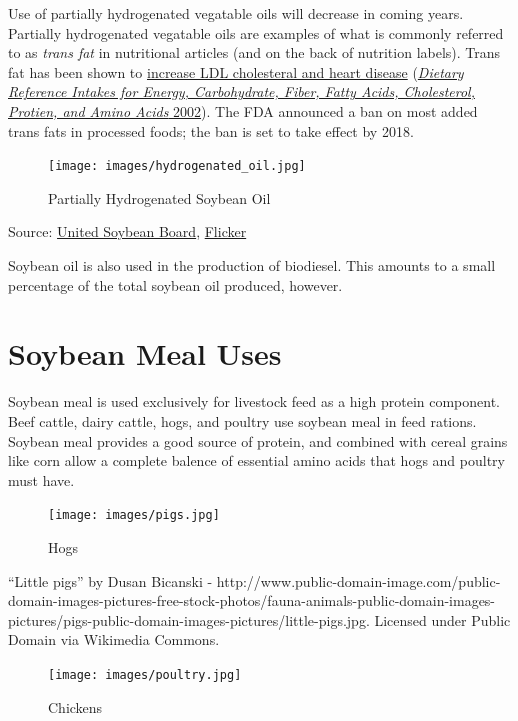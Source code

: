 \documentclass[
]{book}
\begin{document}
Use of partially hydrogenated vegatable oils will decrease in coming years. Partially hydrogenated vegatable oils are examples of what is commonly referred to as \emph{trans fat} in nutritional articles (and on the back of nutrition labels). Trans fat has been shown to \href{http://www.fda.gov/ForConsumers/ConsumerUpdates/ucm372915.htm}{increase LDL cholesteral and heart disease} (\protect\hyperlink{ref-dri2002Nap}{\emph{Dietary Reference Intakes for Energy, Carbohydrate, Fiber, Fatty Acids, Cholesterol, Protien, and Amino Acids} 2002}). The FDA announced a ban on most added trans fats in processed foods; the ban is set to take effect by 2018.

\begin{figure}
\centering
\texttt{[image: images/hydrogenated\_oil.jpg]}
\caption{Partially Hydrogenated Soybean Oil}
\end{figure}

Source: \href{http://unitedsoybean.org/}{United Soybean Board}, \href{https://www.flickr.com/photos/unitedsoybean/16910795086/}{Flicker}

Soybean oil is also used in the production of biodiesel. This amounts to a small percentage of the total soybean oil produced, however.

\hypertarget{soybean-meal-uses}{%
\section{Soybean Meal Uses}\label{soybean-meal-uses}}

Soybean meal is used exclusively for livestock feed as a high protein component. Beef cattle, dairy cattle, hogs, and poultry use soybean meal in feed rations. Soybean meal provides a good source of protein, and combined with cereal grains like corn allow a complete balence of essential amino acids that hogs and poultry must have.

\begin{figure}
\centering
\texttt{[image: images/pigs.jpg]}
\caption{Hogs}
\end{figure}

``Little pigs'' by Dusan Bicanski - http://www.public-domain-image.com/public-domain-images-pictures-free-stock-photos/fauna-animals-public-domain-images-pictures/pigs-public-domain-images-pictures/little-pigs.jpg. Licensed under Public Domain via Wikimedia Commons.

\begin{figure}
\centering
\texttt{[image: images/poultry.jpg]}
\caption{Chickens}
\end{figure}
\end{document}
